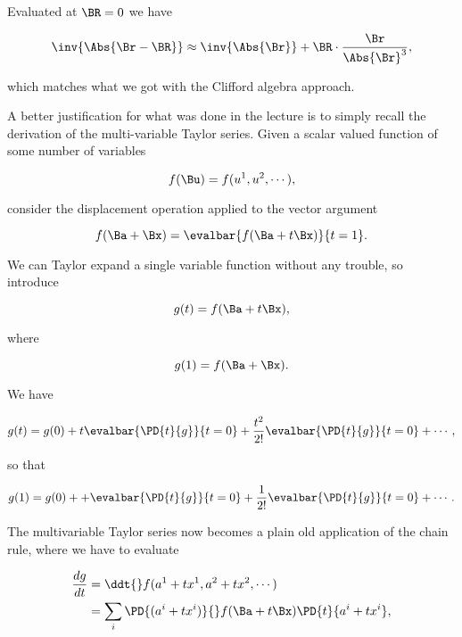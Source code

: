 Evaluated at $\BR = 0$ we have

\begin{equation}\label{eqn:qmTwoL6:190}
\inv{\Abs{\Br - \BR}} \approx \inv{\Abs{\Br}} 
+ 
\BR \cdot \frac{\Br}{\Abs{\Br}^3},
\end{equation}

which matches what we got with the Clifford algebra approach.

A better justification for what was done in the lecture is to simply recall the derivation of the multi-variable Taylor series.  Given a scalar valued function of some number of variables

\begin{equation}\label{eqn:qmTwoL6:210}
f(\Bu) = f(u^1, u^2, \cdots),
\end{equation}

consider the displacement operation applied to the vector argument

\begin{equation}\label{eqn:qmTwoL6:230}
f(\Ba + \Bx) = \evalbar{f(\Ba + t \Bx)}{t=1}.
\end{equation}

We can Taylor expand a single variable function without any trouble, so introduce

\begin{equation}\label{eqn:qmTwoL6:250}
g(t) = f(\Ba + t \Bx),
\end{equation}

where

\begin{equation}\label{eqn:qmTwoL6:270}
g(1) = f(\Ba + \Bx).
\end{equation}

We have 

\begin{equation}\label{eqn:qmTwoL6:290}
g(t) = g(0) 
+ t \evalbar{ \PD{t}{g} }{t = 0}
+ \frac{t^2}{2!} \evalbar{ \PD{t}{g} }{t = 0}
+ \cdots,
\end{equation}

so that

\begin{equation}\label{eqn:qmTwoL6:310}
g(1) = g(0) + 
+ \evalbar{ \PD{t}{g} }{t = 0}
+ \frac{1}{2!} \evalbar{ \PD{t}{g} }{t = 0}
+ \cdots.
\end{equation}

The multivariable Taylor series now becomes a plain old application of the chain rule, where we have to evaluate

\begin{align*}
\frac{dg}{dt} 
&= \ddt{} f(a^1 + t x^1, a^2 + t x^2, \cdots) \\
&= \sum_i \PD{(a^i + t x^i)}{} f(\Ba + t \Bx) \PD{t}{a^i + t x^i},
\end{align*}

